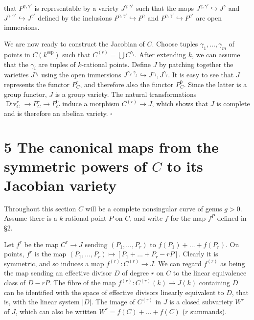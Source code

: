 

\DeclareMathOperator{\Div}{Div}   %


that $P^{\gamma,\gamma'}$ is representable by a variety $J^{\gamma,\gamma'}$
such that the maps $J^{\gamma,\gamma'} \hookrightarrow J^{\gamma}$ and
$J^{\gamma,\gamma'} \hookrightarrow J^{\gamma'}$ defined by the inclusions
$P^{\gamma,\gamma'} \hookrightarrow P^{\gamma}$ and
$P^{\gamma,\gamma'} \hookrightarrow P^{\gamma'}$ are open immersions.

We are now ready to construct the Jacobian of $C$. Choose tuples
$\gamma_1, \dots, \gamma_m$ of points in $C(k^{\mathrm{sep}})$ such that
$C^{(r)} = \bigcup C^{\gamma_i}$. After extending $k$, we can assume that the
$\gamma_i$ are tuples of $k$-rational points. Define $J$ by patching together
the varieties $J^{\gamma_i}$ using the open immersions
$J^{\gamma_i,\gamma_j} \hookrightarrow J^{\gamma_i}, J^{\gamma_j}$. It is easy
to see that $J$ represents the functor $P_C^r$, and therefore also the functor
$P_C^0$. Since the latter is a group functor, $J$ is a group variety. The
natural transformations $\Div_C^r \to P_C^r \to P_C^0$ induce a morphism
$C^{(r)} \to J$, which shows that $J$ is complete and is therefore an abelian
variety. \hfill $\square$

\section*{5 \quad The canonical maps from the symmetric powers of $C$ to its
Jacobian variety}

Throughout this section $C$ will be a complete nonsingular curve of genus
$g > 0$. Assume there is a $k$-rational point $P$ on $C$, and write $f$ for
the map $f^P$ defined in \S 2.

Let $f^r$ be the map $C^r \to J$ sending $(P_1, \dots, P_r)$ to
$f(P_1) + \dots + f(P_r)$. On points, $f^r$ is the map
$(P_1, \dots, P_r) \mapsto [P_1 + \dots + P_r - rP]$. Clearly it is
symmetric, and so induces a map $f^{(r)} \colon C^{(r)} \to J$. We can regard
$f^{(r)}$ as being the map sending an effective divisor $D$ of degree $r$ on
$C$ to the linear equivalence class of $D - rP$. The fibre of the map
$f^{(r)} \colon C^{(r)}(k) \to J(k)$ containing $D$ can be identified with the
space of effective divisors linearly equivalent to $D$, that is, with the
linear system $|D|$. The image of $C^{(r)}$ in $J$ is a closed subvariety
$W^r$ of $J$, which can also be written $W^r = f(C) + \dots + f(C)$ ($r$
summands).

